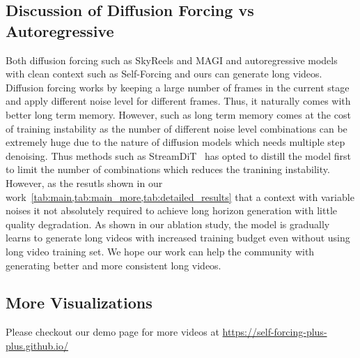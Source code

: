 \subsection{Discussion of Diffusion Forcing vs Autoregressive} Both diffusion forcing such as SkyReels and MAGI and autoregressive models with clean context such as Self-Forcing and ours can generate long videos. Diffusion forcing works by keeping a large number of frames in the current stage and apply different noise level for different frames. Thus, it naturally comes with better long term memory. However, such as long term memory comes at the cost of training instability as the number of different noise level combinations can be extremely huge due to the nature of diffusion models which needs multiple step denoising. Thus methods such as StreamDiT~\citep{kodaira2025streamdit} has opted to distill the model first to limit the number of combinations which reduces the tranining instability. However, as the resutls shown in our work~\cref{tab:main,tab:main_more,tab:detailed_results} that a context with variable noises it not absolutely required to achieve long horizon generation with little quality degradation. As shown in our ablation study, the model is gradually learns to generate long videos with increased training budget even without using long video training set. We hope our work can help the community with generating better and more consistent long videos.


\subsection{More Visualizations}
Please checkout our demo page for more videos at \href{https://self-forcing-plus-plus.github.io/}{https://self-forcing-plus-plus.github.io/}